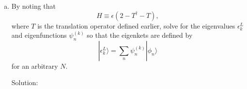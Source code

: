 \begin{homeworkProblem}
\begin{enumerate}[(a)]
\begin{callout}{Solution:}
{                    $$\ket{\psi_n^{(k)}} = \epsilon\begin{bmatrix}
                        0.3162 & -0.4423 & 0.0663 & -0.4472 & 0.0000 & 0.4472 & 0.0053 & 0.0019 & 0.4472 & 0.3162 \\
                        0.3162 & -0.3968 & -0.2064 & -0.1382 & 0.4253 & -0.1331 & -0.4269 & 0.2614 & -0.3629 & -0.3162 \\
                        0.3162 & -0.1997 & -0.4002 & 0.3618 & 0.2629 & -0.3649 & 0.2586 & -0.4247 & 0.1400 & 0.3162 \\
                        0.3162 & 0.0736 & -0.4411 & 0.3618 & -0.2628 & 0.3587 & 0.2671 & 0.4259 & 0.1364 & -0.3162 \\
                        0.3162 & 0.3189 & -0.3136 & -0.1382 & -0.4253 & 0.1432 & -0.4237 & -0.2644 & -0.3607 & 0.3162 \\
                        0.3162 & 0.4423 & -0.0663 & -0.4472 & 0.0000 & -0.4472 & -0.0053 & 0.0019 & 0.4472 & -0.3162 \\
                        0.3162 & 0.3968 & 0.2064 & -0.1382 & 0.4253 & 0.1331 & 0.4269 & 0.2614 & -0.3629 & 0.3162 \\
                        0.3162 & 0.1997 & 0.4002 & 0.3618 & 0.2629 & 0.3649 & -0.2586 & -0.4247 & 0.1400 & -0.3162 \\
                        0.3162 & -0.0736 & 0.4411 & 0.3618 & -0.2628 & -0.3587 & -0.2671 & 0.4259 & 0.1364 & 0.3162 \\
                        0.3162 & -0.3189 & 0.3136 & -0.1382 & -0.4253 & -0.1432 & 0.4237 & -0.2644 & -0.3607 & -0.3162
                \end{bmatrix}$$}

                \end{callout}

                \newpage
            \item By noting that
                \[
                    H \equiv \epsilon\left(2 - T^\dagger - T\right),
                \]
                where $T$ is the translation operator defined earlier, solve for the eigenvalues $\epsilon_k^L$ and eigenfunctions $\psi_n^{(k)}$ so that the eigenkets are defined by
                \[
                    |\epsilon_k^L\rangle = \sum_n \psi_n^{(k)}|\phi_n\rangle
                \]
                for an arbitrary $N$.
                \begin{callout}{Solution:}


\end{callout}
\end{enumerate}
\end{homeworkProblem}
